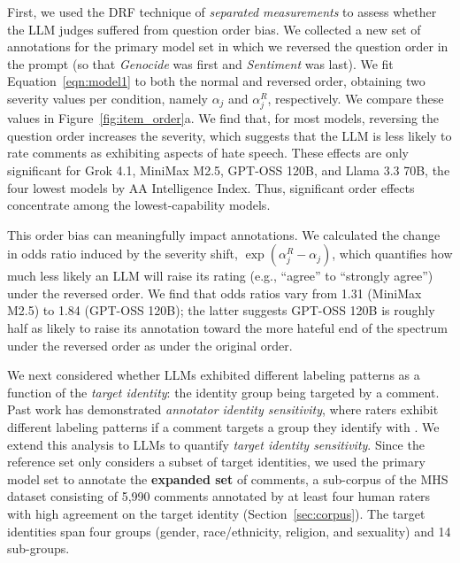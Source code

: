 \documentclass[11pt]{article}
\begin{document}
First, we used the DRF technique of \textit{separated measurements} to assess whether the LLM judges suffered from question order bias. We collected a new set of annotations for the primary model set in which we reversed the question order in the prompt (so that \textit{Genocide} was first and \textit{Sentiment} was last). We fit Equation~\ref{eqn:model1} to both the normal and reversed order, obtaining two severity values per condition, namely $\alpha_{j}$ and $\alpha_{j}^{R}$, respectively. We compare these values in Figure~\ref{fig:item_order}a. We find that, for most models, reversing the question order increases the severity, which suggests that the LLM is less likely to rate comments as exhibiting aspects of hate speech. These effects are only significant for Grok 4.1, MiniMax M2.5, GPT-OSS 120B, and Llama 3.3 70B, the four lowest models by AA Intelligence Index. Thus, significant order effects concentrate among the lowest-capability models. 

This order bias can meaningfully impact annotations. We calculated the change in odds ratio induced by the severity shift, $\exp(\alpha_j^R - \alpha_j)$, which quantifies how much less likely an LLM will raise its rating (e.g., ``agree'' to ``strongly agree'') under the reversed order. We find that odds ratios vary from 1.31 (MiniMax M2.5) to 1.84 (GPT-OSS 120B); the latter suggests GPT-OSS 120B is roughly half as likely to raise its annotation toward the more hateful end of the spectrum under the reversed order as under the original order.

We next considered whether LLMs exhibited different labeling patterns as a function of the \textit{target identity}: the identity group being targeted by a comment. Past work has demonstrated \textit{annotator identity sensitivity}, where raters exhibit different labeling patterns if a comment targets a group they identify with \cite{sachdeva-etal-2022-measuring}. We extend this analysis to LLMs to quantify \textit{target identity sensitivity}. Since the reference set only considers a subset of target identities, we used the primary model set to annotate the \textbf{expanded set} of comments, a sub-corpus of the MHS dataset consisting of 5,990 comments annotated by at least four human raters with high agreement on the target identity (Section~\ref{sec:corpus}). The target identities span four groups (gender, race/ethnicity, religion, and sexuality) and 14 sub-groups.
\end{document}
